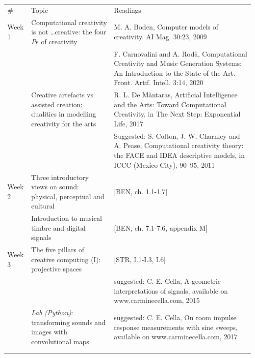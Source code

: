 \documentclass[letterpaper]{inzane_syllabus} %
\begin{document}
\begin{center}
\begin{tabularx}{\textwidth}{p{2cm}p{8cm} @{\hskip 0.5cm} p{9.5cm}} %
\arrayrulecolor{myCOLOR}\hline
\hline 
\hline 

\multicolumn{3}{l}{\textbf{\textcolor{myCOLOR}{\large MODULE 1: Foundations }}} \\
\hline
  \# & Topic & Readings \\ \hline 
Week 1 &
Computational creativity is not \ldots creative: the four \emph{P}s of creativity & M. A. Boden, Computer models of creativity. AI Mag. 30:23, 2009 \\

& & F. Carnovalini and A. Rod\`a, Computational Creativity and Music Generation Systems: An Introduction to the State of the Art. Front. Artif. Intell. 3:14, 2020  \\

& Creative artefacts vs assisted creation: dualities in modelling creativity for the arts&  R. L. De M\`antaras, Artificial Intelligence and the Arts: Toward Computational Creativity, in The Next Step: Exponential Life, 2017\\
& &  Suggested: S. Colton, J. W. Charnley and A. Pease, Computational creativity theory: the FACE and IDEA descriptive models, in ICCC (Mexico City), 90–95, 2011 \\
\arrayrulecolor{maingray}\hline

Week 2 & Three introductory views on sound: physical, perceptual and cultural & [BEN, ch. 1.1-1.7]\\

& Introduction to musical timbre and digital signals & [BEN, ch. 7.1-7.6, appendix M]\\
\arrayrulecolor{maingray}\hline

Week 3 & The five pillars of creative computing (I): projective spaces & [STR, I.1-I.3, I.6]\\

& & suggested: C. E. Cella, A geometric interpretations of signals, available on www.carminecella.com, 2015\\

& \emph{Lab (Python)}: transforming sounds and images with convolutional maps & suggested: C. E. Cella, On room impulse response measurements with sine sweeps, available on www.carminecella.com, 2017 \\
& & \\ 
\arrayrulecolor{maingray}\hline


\end{tabularx}
\end{center}
\end{document}
